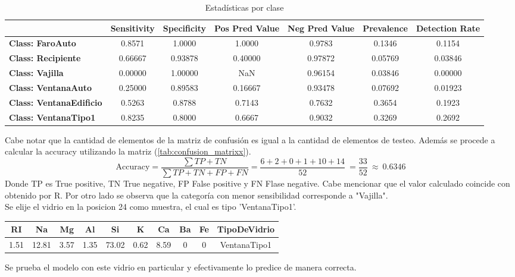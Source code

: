 \begin{table}[htbp]
  \centering
    \begin{tabular}{lcccccc}
    \hline
          & \textbf{Sensitivity} & \textbf{Specificity} & \textbf{Pos Pred Value} & \textbf{Neg Pred Value} & \textbf{Prevalence} & \textbf{Detection Rate} \\
    \hline
    \textbf{Class: FaroAuto} & 0.8571 & 1.0000 & 1.0000 & 0.9783 & 0.1346 & 0.1154 \\
    \textbf{Class: Recipiente} & 0.66667 & 0.93878 & 0.40000 & 0.97872 & 0.05769 & 0.03846 \\
    \textbf{Class: Vajilla} & 0.00000 & 1.00000 & NaN   & 0.96154 & 0.03846 & 0.00000 \\
    \textbf{Class: VentanaAuto} & 0.25000 & 0.89583 & 0.16667 & 0.93478 & 0.07692 & 0.01923 \\
    \textbf{Class: VentanaEdificio} & 0.5263 & 0.8788 & 0.7143 & 0.7632 & 0.3654 & 0.1923 \\
    \textbf{Class: VentanaTipo1} & 0.8235 & 0.8000 & 0.6667 & 0.9032 & 0.3269 & 0.2692 \\
    \hline
    \end{tabular}%
      \caption{Estadísticas por clase}
  \label{tab:class_stats}%
\end{table}%
Cabe notar que la cantidad de elementos de la matriz de confusión es igual a la cantidad de elementos de testeo. Además se procede a calcular la accuracy utilizando la matriz (\ref{tab:confusion_matrixx}).
\begin{equation}
\text{Accuracy}=\frac{\sum TP+TN}{\sum TP+TN+FP+FN}=\frac{6+2+0+1+10+14}{52} \ = \frac{33}{52} \ \approx \ 0.6346  
\end{equation}
Donde TP es True positive, TN True negative, FP False positive y FN Flase negative. Cabe mencionar que el valor calculado coincide con obtenido por R.
Por otro lado se observa que la categoría con menor sensibilidad corresponde a "Vajilla".\\
Se elije el vidrio en la posicion 24 como muestra, el cual es tipo 'VentanaTipo1'.
\begin{table}[h]
\centering
\begin{tabular}{|c|c|c|c|c|c|c|c|c|c|}
\hline
\textbf{RI} & \textbf{Na} & \textbf{Mg} & \textbf{Al} & \textbf{Si} & \textbf{K} & \textbf{Ca} & \textbf{Ba} & \textbf{Fe} & \textbf{TipoDeVidrio} \\
\hline
1.51 & 12.81 & 3.57 & 1.35 & 73.02 & 0.62 & 8.59 & 0 & 0 & VentanaTipo1 \\
\hline
\end{tabular}
\end{table}
Se prueba el modelo con este vidrio en particular y efectivamente lo predice de manera correcta.

